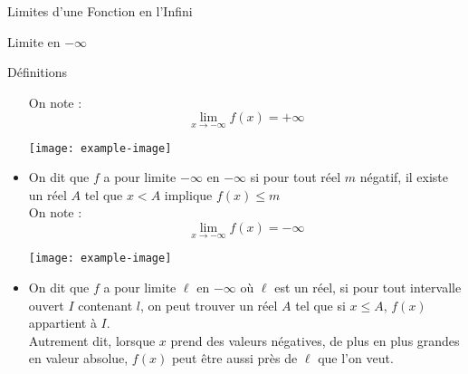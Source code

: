 \documentclass{cours}
\begin{document}
\begin{Gpartie}{Limites d'une Fonction en l'Infini}
\begin{Spartie}{Limite en $-\infty$}
\begin{SSpartie}{Définitions}
\begin{itemize}
                    On note : \[\lim\limits_{x\to-\infty}f(x)=+\infty\]
                    \begin{center}
                            \texttt{[image: example-image]}
                        \parbox{\linewidth}{}
                    \end{center}
                    \vspace*{2ex}
                    \item   On dit que $f$ a pour limite $-\infty$ en $-\infty$ si pour tout réel $m$ négatif, il existe un réel $A$ tel que $x<A$ implique $f(x)\leq m$ \\ On note : \[\lim\limits_{x\to-\infty}f(x)=-\infty\]
                    \begin{center}
                            \texttt{[image: example-image]}
                        \parbox{\linewidth}{}
                    \end{center}
                    \pagebreak
                    \item   On dit que $f$ a pour limite $\ell$ en $-\infty$ où $\ell$ est un réel, si pour tout intervalle ouvert $I$ contenant $l$, on peut trouver un réel $A$ tel que si $x\leq A$, $f(x)$ appartient à $I$. \\ Autrement dit, lorsque $x$ prend des valeurs négatives, de plus en plus grandes en valeur absolue, $f(x)$ peut être aussi près de $\ell$ que l'on veut.
                    

\end{itemize}
\end{SSpartie}
\end{Spartie}
\end{Gpartie}
\end{document}
